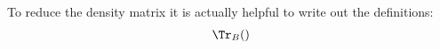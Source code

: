 To reduce the density matrix it is actually helpful to write out the definitions:
\begin{align}
\Tr_B()
\end{align}